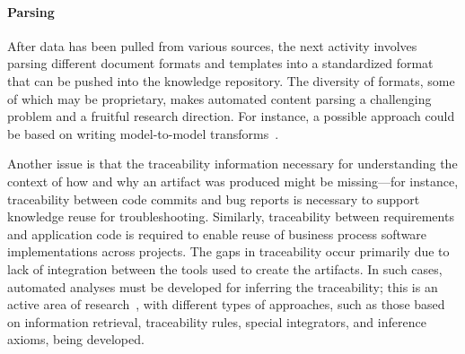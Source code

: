 
\vskip -5pt
\paragraph*{Parsing} After data has been pulled from various
sources, the next activity involves parsing different document formats and
templates into a standardized format that can be pushed into the knowledge
repository. The diversity of formats, some of which may be proprietary, makes
automated content parsing a challenging problem and a fruitful research
direction. For instance, a possible approach could be based on writing
model-to-model transforms~\cite{debdoot:2010:scc}.

Another issue is that the traceability information necessary for understanding
the context of how and why an artifact was produced might be missing---for
instance, traceability between code commits and bug reports is necessary to
support knowledge reuse for troubleshooting. Similarly, traceability between
requirements and application code is required to enable reuse of business
process software implementations across projects. The gaps in traceability occur
primarily due to lack of integration between the tools used to create the
artifacts. In such cases, automated analyses must be developed for inferring the
traceability; this is an active area of research~\cite{spanoudakis2005software},
with different types of approaches, such as those based on information
retrieval, traceability rules, special integrators, and inference axioms, being
developed.

